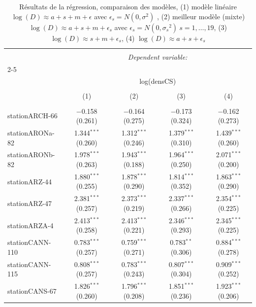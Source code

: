 
\begin{table}[!htbp] \centering 
  \caption{Résultats de la régression,
				comparaison des modèles, (1) modèle linéaire $\log (D){\approx}a+s+m+\epsilon$ avec $\epsilon_s=N(0,{\sigma}^2) $
				, (2) meilleur modèle (mixte) $\log (D){\approx}a+s+m+\epsilon_s$ avec $\epsilon_s=N(0,{\sigma_{s}}^2) ~s=1,\dots,19$,
				(3) $\log (D){\approx}s+m+\epsilon_s$,
				(4) $\log (D){\approx}a+s+\epsilon_s$} 
  \label{annex_regression_result} 
\begin{tabular}{@{\extracolsep{5pt}}lcccc} 
\\[-1.8ex]\hline 
\hline \\[-1.8ex] 
 & \multicolumn{4}{c}{\textit{Dependent variable:}} \\ 
\cline{2-5} 
\\[-1.8ex] & \multicolumn{4}{c}{log(densCS)} \\ 
\\[-1.8ex] & (1) & (2) & (3) & (4)\\ 
\hline \\[-1.8ex] 
 stationARCH-66 & $-$0.158 (0.261) & $-$0.164 (0.275) & $-$0.173 (0.324) & $-$0.162 (0.273) \\ 
  stationARONa-82 & 1.344$^{***}$ (0.260) & 1.312$^{***}$ (0.246) & 1.379$^{***}$ (0.310) & 1.439$^{***}$ (0.260) \\ 
  stationARONb-82 & 1.978$^{***}$ (0.263) & 1.943$^{***}$ (0.188) & 1.964$^{***}$ (0.250) & 2.071$^{***}$ (0.200) \\ 
  stationARZ-44 & 1.880$^{***}$ (0.255) & 1.878$^{***}$ (0.290) & 1.814$^{***}$ (0.352) & 1.863$^{***}$ (0.290) \\ 
  stationARZ-47 & 2.381$^{***}$ (0.257) & 2.373$^{***}$ (0.219) & 2.337$^{***}$ (0.266) & 2.354$^{***}$ (0.225) \\ 
  stationARZA-4 & 2.413$^{***}$ (0.258) & 2.413$^{***}$ (0.221) & 2.346$^{***}$ (0.293) & 2.345$^{***}$ (0.225) \\ 
  stationCANN-110 & 0.783$^{***}$ (0.257) & 0.759$^{***}$ (0.271) & 0.783$^{**}$ (0.306) & 0.884$^{***}$ (0.278) \\ 
  stationCANN-115 & 0.808$^{***}$ (0.257) & 0.783$^{***}$ (0.243) & 0.807$^{***}$ (0.304) & 0.909$^{***}$ (0.252) \\ 
  stationCANS-67 & 1.826$^{***}$ (0.260) & 1.796$^{***}$ (0.208) & 1.851$^{***}$ (0.236) & 1.923$^{***}$ (0.206) \\ 

\end{tabular}
\end{table}
